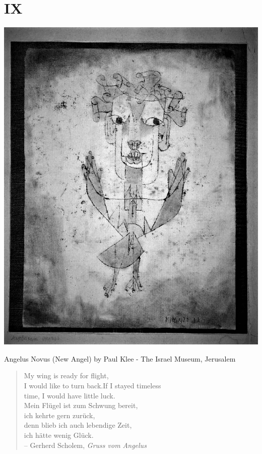 \documentclass[12pt]{tufte-handout}
\begin{document}
\section{IX}
\begin{marginfigure}%
  \includegraphics[width=\linewidth]{graphics/Klee,_paul,_angelus_novus,_1920.jpg}
  \caption{Angelus Novus (New Angel) by Paul Klee - The Israel Museum, Jerusalem}
  \label{fig:deCoulanges}
\end{marginfigure}
\begin{quote}
My wing is ready for flight, \\ 
I would like to turn back.If I stayed timeless \\time, 
I would have little luck. \\
 
 
Mein Flügel ist zum Schwung bereit,\\
ich kehrte gern zurück,\\
denn blieb ich auch lebendige Zeit,\\
ich hätte wenig Glück.\\

-- Gerherd Scholem, \textit{Gruss vom Angelus}
\end{quote} 	
 
\end{document}
